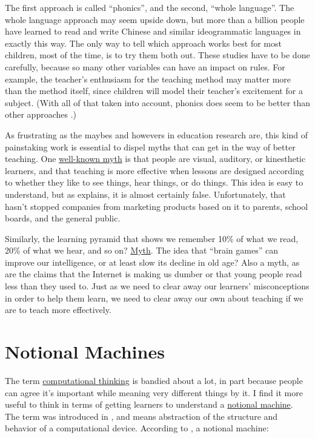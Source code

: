 The first approach is called ``phonics'', and the second, ``whole
language''. The whole language approach may seem upside down, but more
than a billion people have learned to read and write Chinese and similar
ideogrammatic languages in exactly this way. The only way to tell which
approach works best for most children, most of the time, is to try them
both out. These studies have to be done carefully, because so many other
variables can have an impact on rules. For example, the teacher's
enthusiasm for the teaching method may matter more than the method
itself, since children will model their teacher's excitement for a
subject. (With all of that taken into account, phonics does seem to be
better than other approaches \cite{Foor1998}.)

As frustrating as the maybes and howevers in education research are,
this kind of painstaking work is essential to dispel myths that can
get in the way of better teaching. One \href{https://en.wikipedia.org/wiki/Learning\_styles\#Learning\_modalities}{well-known
myth} is that people are visual, auditory, or
kinesthetic learners, and that teaching is more effective when lessons
are designed according to whether they like to see things, hear
things, or do things. This idea is easy to understand, but as
\cite{DeBr2015} explains, it is almost certainly
false. Unfortunately, that hasn't stopped companies from marketing
products based on it to parents, school boards, and the general
public.

Similarly, the learning pyramid that shows we remember 10\% of what we
read, 20\% of what we hear, and so on? \href{https://www.worklearning.com/2015/01/05/mythical-retention-data-the-corrupted-cone/}{Myth}. The
idea that ``brain games'' can improve our intelligence, or at least slow
its decline in old age? Also a myth, as are the claims that the
Internet is making us dumber or that young people read less than they
used to. Just as we need to clear away our learners' misconceptions in
order to help them learn, we need to clear away our own about teaching
if we are to teach more effectively.

\section{Notional Machines}\label{notional-machines}

The term \protect\hyperlink{g:computational-thinking}{computational thinking} is
bandied about a lot, in part because people can agree it's important
while meaning very different things by it. I find it more useful to
think in terms of getting learners to understand a \protect\hyperlink{g:notional-machine}{notional
machine}. The term was introduced in
\cite{DuBo1986}, and means abstraction of the structure and
behavior of a computational device. According to \cite{Sorv2013},
a notional machine:

